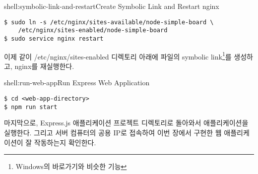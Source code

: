 \begin{shellenv}{shell:symbolic-link-and-restart}{Create Symbolic Link and Restart nginx}\begin{verbatim}
$ sudo ln -s /etc/nginx/sites-available/node-simple-board \
    /etc/nginx/sites-enabled/node-simple-board
$ sudo service nginx restart
\end{verbatim}
\end{shellenv}

이제 \와 같이 /etc/nginx/sites-enabled 디렉토리 아래에  파일의 symbolic link\footnote{Windows의 바로가기와 비슷한 기능}를 생성하고, nginx를 재실행한다.

\begin{shellenv}{shell:run-web-app}{Run Express Web Application}\begin{verbatim}
$ cd <web-app-directory>
$ npm run start
\end{verbatim}
\end{shellenv}

마지막으로, Express.js 애플리케이션 프로젝트 디렉토리로 돌아와서 애플리케이션을 실행한다. 그리고 서버 컴퓨터의 공용 IP로 접속하여 이번 장에서 구현한 웹 애플리케이션이 잘 작동하는지 확인한다.

